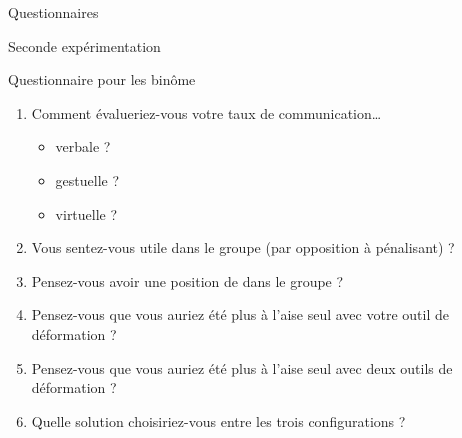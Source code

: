 \documentclass[myfrancais,ngerman,english,french]{mythesis}
\begin{document}
\begin{mychapter}{Questionnaires}
\begin{mysection}{Seconde expérimentation}
\begin{mysubsection}{Questionnaire pour les binôme}
\begin{enumerate}
					\item Comment évalueriez-vous votre taux de communication\dots{}
						\begin{itemize}
							\item verbale ?
							\item gestuelle ?
							\item virtuelle ?
						\end{itemize}
					\item Vous sentez-vous utile dans le groupe (par opposition à pénalisant) ?
					\item Pensez-vous avoir une position de  dans le groupe ?
					\item Pensez-vous que vous auriez été plus à l'aise seul avec votre outil de déformation ?
					\item Pensez-vous que vous auriez été plus à l'aise seul avec deux outils de déformation ?
					\item Quelle solution choisiriez-vous entre les trois configurations ?
				\end{enumerate}


\end{mysubsection}
\end{mysection}
\end{mychapter}
\end{document}
